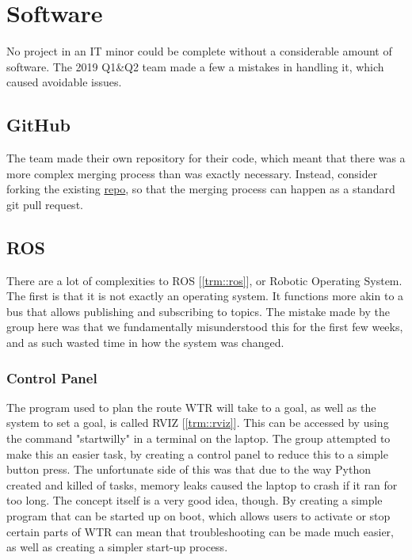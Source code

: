 \section{Software}
No project in an IT minor could be complete without a considerable amount of software.
The 2019 Q1\&Q2 team made a few a mistakes in handling it, which caused avoidable issues.

\subsection{GitHub}
The team made their own repository for their code, which meant that there was a more complex merging process than was exactly necessary.
Instead, consider forking the existing \href{https://github.com/Windesheim-Willy/}{repo}, so that the merging process can happen as a standard git pull request.

\subsection{ROS}
There are a lot of complexities to ROS [\ref{trm::ros}], or Robotic Operating System.
The first is that it is not exactly an operating system.
It functions more akin to a bus that allows publishing and subscribing to topics.
The mistake made by the group here was that we fundamentally misunderstood this for the first few weeks, and as such wasted time in how the system was changed.

\subsubsection{Control Panel}
The program used to plan the route WTR will take to a goal, as well as the system to set a goal, is called RVIZ [\ref{trm::rviz}].
This can be accessed by using the command "startwilly" in a terminal on the laptop.
The group attempted to make this an easier task, by creating a control panel to reduce this to a simple button press.
The unfortunate side of this was that due to the way Python created and killed of tasks, memory leaks caused the laptop to crash if it ran for too long.
The concept itself is a very good idea, though.
By creating a simple program that can be started up on boot, which allows users to activate or stop certain parts of WTR can mean that troubleshooting can be made much easier, as well as creating a simpler start-up process.

